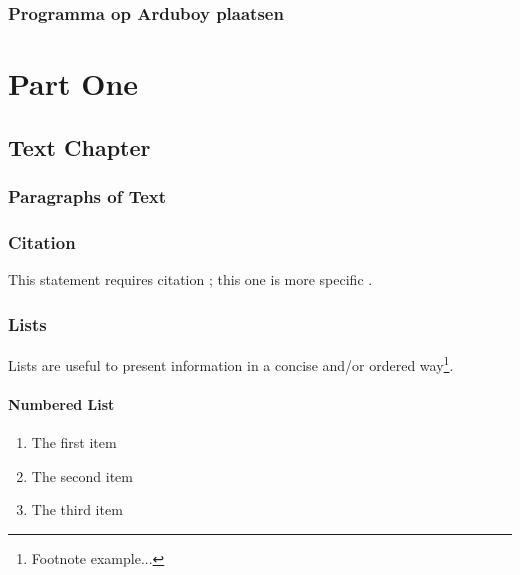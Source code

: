 \documentclass[11pt,fleqn]{book} %
\begin{document}
\section{Programma op Arduboy plaatsen}



\part{Part One}


\chapter{Text Chapter}

\section{Paragraphs of Text}

\lipsum[1-7] %


\section{Citation}

This statement requires citation \cite{article_key}; this one is more specific \cite[162]{book_key}.


\section{Lists}

Lists are useful to present information in a concise and/or ordered way\footnote{Footnote example...}.

\subsection{Numbered List}

\begin{enumerate}
\item The first item
\item The second item
\item The third item
\end{enumerate}
\end{document}
